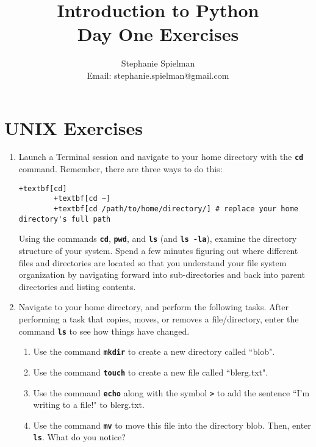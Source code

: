 \documentclass{article}[12pt]
\newcommand{\code}[1]{\textbf{\texttt{#1}}}
\begin{document}
\title{Introduction to Python \\ Day One Exercises}
\author{Stephanie Spielman \\ \footnotesize{Email: stephanie.spielman@gmail.com}}
\date{}
\maketitle{}

\section*{UNIX Exercises}

\begin{enumerate}[itemsep=5ex]
	\item Launch a Terminal session and navigate to your home directory with the \code{cd} command. Remember, there are three ways to do this:
		\begin{Verbatim}[fontsize=\small,xleftmargin=-2.5cm,commandchars=+\[\]]
		+textbf[cd]
		+textbf[cd ~]
		+textbf[cd /path/to/home/directory/] # replace your home directory's full path
		\end{Verbatim}
		Using the commands \code{cd}, \code{pwd}, and \code{ls} (and \code{ls -la}), examine the directory structure of your system. Spend a few minutes figuring out where different files and directories are located so that you understand your file system organization by navigating forward into sub-directories and back into parent directories and listing contents.
	
	\item Navigate to your home directory, and perform the following tasks. After performing a task that copies, moves, or removes a file/directory, enter the command \code{ls} to see how things have changed.
	\begin{enumerate}[itemsep=2ex]
		\item Use the command \code{mkdir} to create a new directory called ``blob".
		
		\item Use the command \code{touch} to create a new file called ``blerg.txt".
		
		\item Use the command \code{echo} along with the symbol \code{>} to add the sentence ``I'm writing to a file!" to blerg.txt.
		
		\item Use the command \code{mv} to move this file into the directory blob. Then, enter \code{ls}. What do you notice?
		

\end{enumerate}
\end{enumerate}
\end{document}
